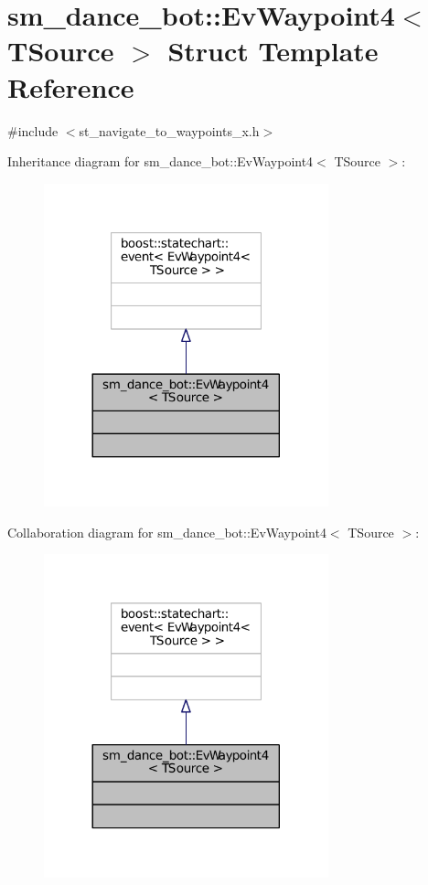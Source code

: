 \hypertarget{structsm__dance__bot_1_1EvWaypoint4}{}\section{sm\+\_\+dance\+\_\+bot\+:\+:Ev\+Waypoint4$<$ T\+Source $>$ Struct Template Reference}
\label{structsm__dance__bot_1_1EvWaypoint4}


{\ttfamily \#include $<$st\+\_\+navigate\+\_\+to\+\_\+waypoints\+\_\+x.\+h$>$}



Inheritance diagram for sm\+\_\+dance\+\_\+bot\+:\+:Ev\+Waypoint4$<$ T\+Source $>$\+:
\nopagebreak
\begin{figure}[H]
\begin{center}
\leavevmode
\includegraphics[width=233pt]{structsm__dance__bot_1_1EvWaypoint4__inherit__graph}
\end{center}
\end{figure}


Collaboration diagram for sm\+\_\+dance\+\_\+bot\+:\+:Ev\+Waypoint4$<$ T\+Source $>$\+:
\nopagebreak
\begin{figure}[H]
\begin{center}
\leavevmode
\includegraphics[width=233pt]{structsm__dance__bot_1_1EvWaypoint4__coll__graph}
\end{center}
\end{figure}


